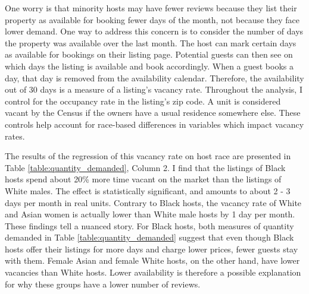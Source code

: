 One worry is that minority hosts may have fewer reviews because they list their property as available for booking fewer days of the month, not because they face lower demand. One way to address this concern is to consider the number of days the property was available over the last month. The host can mark certain days as available for bookings on their listing page. Potential guests can then see on which days the listing is available and book accordingly. When a guest books a day, that day is removed from the availability calendar. Therefore, the availability out of 30 days is a measure of a listing's vacancy rate. Throughout the analysis, I control for the occupancy rate in the listing's zip code. A unit is considered vacant by the Census if the owners have a usual residence somewhere else. These controls help account for race-based differences in variables which impact vacancy rates. 

The results of the regression of this vacancy rate on host race are presented in Table \ref{table:quantity_demanded}, Column 2. I find that the listings of Black hosts spend about 20\% more time vacant on the market than the listings of White males. The effect is statistically significant, and amounts to about 2 - 3 days per month in real units. Contrary to Black hosts, the vacancy rate of White and Asian women is actually lower than White male hosts by 1 day per month. These findings tell a nuanced story. For Black hosts, both measures of quantity demanded in Table \ref{table:quantity_demanded} suggest that even though Black hosts offer their listings for more days and charge lower prices, fewer guests stay with them. Female Asian and female White hosts, on the other hand, have lower vacancies than White hosts. Lower availability is therefore a possible explanation for why these groups have a lower number of reviews. 


